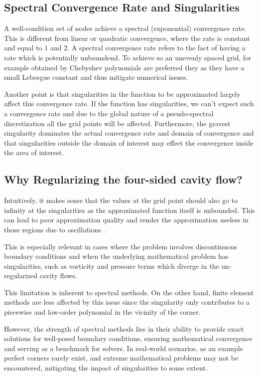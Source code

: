 \subsection{Spectral Convergence Rate and Singularities}

A well-condition set of nodes achieve a spectral (exponential) convergence
\citep{meseguer2020} rate. This is different from linear or quadratic
convergence, where the rate is constant and equal to $1$ and $2$. A spectral
convergence rate refers to the fact of having a rate which is potentially
unboundend. To achieve so an unevenly spaced grid, for example obtained by
Chebyshev polynomials are preferred they as they have a small Lebesgue constant
and thus mitigate numerical issues. 

Another point is that singularities in the function to be approximated largely
affect this convergence rate. If the function has singularities, we can't expect
such a convergence rate and due to the global nature of a pseudo-spectral
discretization all the grid points will be affected. Furthermore, the 
gravest singularity dominates the actual convergence rate and domain of
convergence and that singularities outside the domain of interest may effect
the convergence inside the area of interest. 

\subsection{Why Regularizing the four-sided cavity flow?}

Intuitively, it makes sense that the values at the grid point should also go to
infinity at the singularities as the approximated function itself is unbounded.
This can lead to poor approximation quality and render the approximation
useless in those regions due to oscillations \citep{canuto2006}.

This is especially relevant in cases where the problem involves discontinuous
boundary conditions and when the underlying mathematical problem has
singularities, such as vorticity and pressure terms which diverge in the
un-regularized cavity flows.

This limitation is inherent to spectral methods. On the other hand, finite
element methods are less affected by this issue since the singularity only
contributes to a piecewise and low-order polynomial in the vicinity of the
corner.

However, the strength of spectral methods lies in their ability to provide
exact solutions for well-posed boundary conditions, ensuring mathematical
convergence and serving as a benchmark for solvers. In real-world scenarios, as
an example perfect corners rarely exist, and extreme mathematical problems may
not be encountered, mitigating the impact of singularities to some extent.

